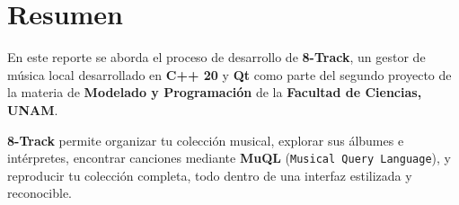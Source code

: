 \section{Resumen}

En este reporte se aborda el proceso de desarrollo de \textbf{8-Track}, un gestor de música
local desarrollado en \textbf{C++ 20} y \textbf{Qt} como parte del segundo proyecto de la
materia de \textbf{Modelado y Programación} de la \textbf{Facultad de Ciencias, UNAM}.

\textbf{8-Track} permite organizar tu colección musical, explorar sus álbumes e intérpretes,
encontrar canciones mediante \textbf{MuQL} (\texttt{Musical Query Language}), y reproducir tu
colección completa, todo dentro de una interfaz estilizada y reconocible.

